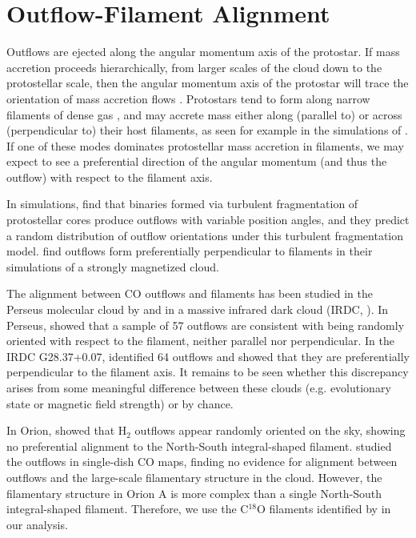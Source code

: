 \documentclass[twocolumn]{aastex63}
\begin{document}
\section{Outflow-Filament Alignment}\label{sec:filaments}
Outflows are ejected along the angular momentum axis of the protostar. If mass accretion proceeds hierarchically, from larger scales of the cloud down to the protostellar scale, then the angular momentum axis of the protostar will trace the orientation of mass accretion flows \citep{Bodenheimer95}. Protostars tend to form along narrow filaments of dense gas \citep{Arzoumanian11}, and may accrete mass either along (parallel to) or across (perpendicular to) their host filaments, as seen for example in the simulations of \citet{Li18}. If one of these modes dominates protostellar mass accretion in filaments, we may expect to see a preferential direction of the angular momentum (and thus the outflow) with respect to the filament axis.

In simulations, \citet{Offner16} find that binaries formed via turbulent fragmentation of protostellar cores produce outflows with variable position angles, and they predict a random distribution of outflow orientations under this turbulent fragmentation model. \citet{Li18} find outflows form preferentially perpendicular to filaments in their simulations of a strongly magnetized cloud. 

The alignment between CO outflows and filaments has been studied in the Perseus molecular cloud by \citet{Stephens17} and in a massive infrared dark cloud (IRDC, \citealp{Kong19}). In Perseus, \citet{Stephens17} showed that a sample of 57 outflows are consistent with being randomly oriented with respect to the filament, neither parallel nor perpendicular. In the IRDC G28.37+0.07, \cite{Kong19} identified 64 outflows and showed that they are preferentially perpendicular to the filament axis. It remains to be seen whether this discrepancy arises from some meaningful difference between these clouds (e.g. evolutionary state or magnetic field strength) or by chance.

In Orion, \citet{Davis09} showed that H$_{2}$ outflows appear randomly oriented on the sky, showing no preferential alignment to the North-South integral-shaped filament. \citet{Tanabe19} studied the outflows in single-dish CO maps, finding no evidence for alignment between outflows and the large-scale filamentary structure in the cloud. However, the filamentary structure in Orion A is more complex than a single North-South integral-shaped filament. Therefore, we use the C$^{18}$O filaments identified by \citet{Suri19} in our analysis.
\end{document}
